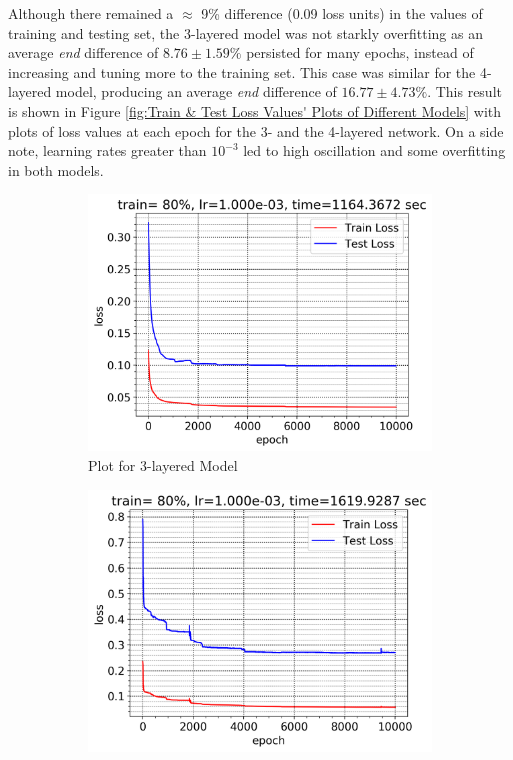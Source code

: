 \documentclass[12pt]{article}
\begin{document}
    Although there remained a $\approx$ 9\% difference (0.09 loss units) in the values of training and testing set, the 3-layered model was not starkly overfitting as an average \textit{end} difference of $8.76\pm1.59\%$ persisted for many epochs, instead of increasing and tuning more to the training set. This case was similar for the 4-layered model, producing an average \textit{end} difference of $16.77 \pm 4.73\%$. This result is shown in Figure \ref{fig:Train & Test Loss Values' Plots of Different Models} with plots of loss values at each epoch for the 3- and the 4-layered network. On a side note, learning rates greater than $10^{-3}$ led to high oscillation and some overfitting in both models.
    \begin{figure}[!htbp]
        \centering
        \begin{subfigure}{.49\textwidth}
            \centering
            \includegraphics[width=\textwidth]{weights_train_test_loss_3_plot}
            \caption{Plot for 3-layered Model}
            \label{fig:Plot for 3-layered Model}
        \end{subfigure}
        \begin{subfigure}{.49\textwidth}
            \centering
            \includegraphics[width=\textwidth]{weights_train_test_loss_4_plot}

\end{subfigure}
\end{figure}
\end{document}
